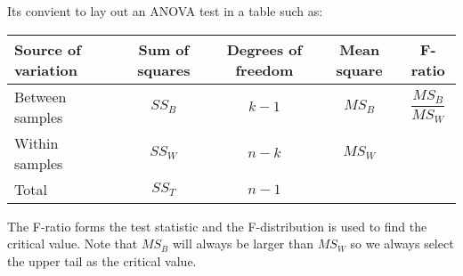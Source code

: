         \noindent
        Its convient to lay out an ANOVA test in a table such as:
        \bgroup
        \def\arraystretch{2}
        \begin{center}
        \begin{tabular}{l|c|c|c|c}
        Source of variation & Sum of squares    & Degrees of freedom    & Mean square   & F-ratio               \\
        \hline
        Between samples     & $SS_B$            & $k-1$                 & $MS_B$        & $\dfrac{MS_B}{MS_W}$  \\
        Within samples      & $SS_W$            & $n-k$                 & $MS_W$        &                       \\
        \hline
        Total               & $SS_T$            & $n-1$                 &               &                       \\
        \end{tabular}
        \end{center}
        \egroup
        The F-ratio forms the test statistic and the F-distribution is used to find the critical value. Note that $MS_B$ will always be larger than $MS_W$ so we always select the upper tail as the critical value.

